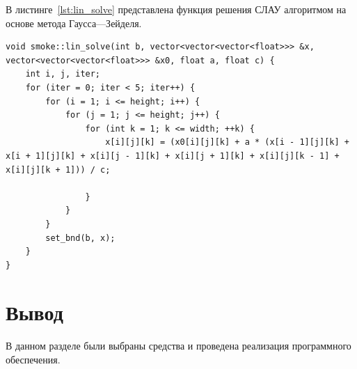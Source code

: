 В листинге~\ref{lst:lin_solve} представлена функция решения СЛАУ алгоритмом на основе метода Гаусса---Зейделя.

\begin{lstlisting}[caption={Функция решения СЛАУ},label={lst:lin_solve}]
void smoke::lin_solve(int b, vector<vector<vector<float>>> &x, vector<vector<vector<float>>> &x0, float a, float c) {
	int i, j, iter;
	for (iter = 0; iter < 5; iter++) {
		for (i = 1; i <= height; i++) {
			for (j = 1; j <= height; j++) {
				for (int k = 1; k <= width; ++k) {
					x[i][j][k] = (x0[i][j][k] + a * (x[i - 1][j][k] + x[i + 1][j][k] + x[i][j - 1][k] + x[i][j + 1][k] + x[i][j][k - 1] + x[i][j][k + 1])) / c;
					
				}
			}
		}
		set_bnd(b, x);
	}
}
\end{lstlisting}

\section*{Вывод}
В данном разделе были выбраны средства и проведена реализация программного обеспечения.
